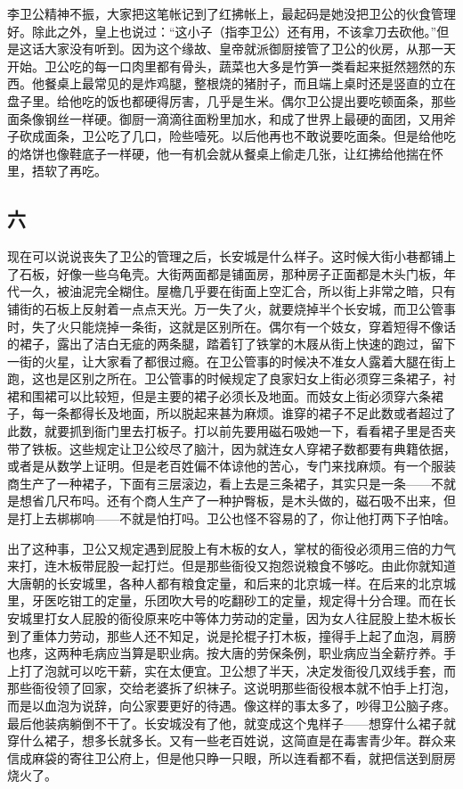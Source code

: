 李卫公精神不振，大家把这笔帐记到了红拂帐上，最起码是她没把卫公的伙食管理好。除此之外，皇上也说过：“这小子（指李卫公）还有用，不该拿刀去砍他。”但是这话大家没有听到。因为这个缘故、皇帝就派御厨接管了卫公的伙房，从那一天开始。卫公吃的每一口肉里都有骨头，蔬菜也大多是竹笋一类看起来挺然翘然的东西。他餐桌上最常见的是炸鸡腿，整根烧的猪肘子，而且端上桌时还是竖直的立在盘子里。给他吃的饭也都硬得厉害，几乎是生米。偶尔卫公提出要吃顿面条，那些面条像钢丝一样硬。御厨一滴滴往面粉里加水，和成了世界上最硬的面团，又用斧子砍成面条，卫公吃了几口，险些噎死。以后他再也不敢说要吃面条。但是给他吃的烙饼也像鞋底子一样硬，他一有机会就从餐桌上偷走几张，让红拂给他揣在怀里，捂软了再吃。 

\subsection{六} 

现在可以说说丧失了卫公的管理之后，长安城是什么样子。这时候大街小巷都铺上了石板，好像一些乌龟壳。大街两面都是铺面房，那种房子正面都是木头门板，年代一久，被油泥完全糊住。屋檐几乎要在街面上空汇合，所以街上非常之暗，只有铺街的石板上反射着一点点天光。万一失了火，就要烧掉半个长安城，而卫公管事时，失了火只能烧掉一条街，这就是区别所在。偶尔有一个妓女，穿着短得不像话的裙子，露出了洁白无疵的两条腿，踏着钉了铁掌的木屐从街上快速的跑过，留下一街的火星，让大家看了都很过瘾。在卫公管事的时候决不准女人露着大腿在街上跑，这也是区别之所在。卫公管事的时候规定了良家妇女上街必须穿三条裙子，衬裙和围裙可以比较短，但是主要的裙子必须长及地面。而妓女上街必须穿六条裙子，每一条都得长及地面，所以脱起来甚为麻烦。谁穿的裙子不足此数或者超过了此数，就要抓到衙门里去打板子。打以前先要用磁石吸她一下，看看裙子里是否夹带了铁板。这些规定让卫公绞尽了脑汁，因为就连女人穿裙子数都要有典籍依据，或者是从数学上证明。但是老百姓偏不体谅他的苦心，专门来找麻烦。有一个服装商生产了一种裙子，下面有三层滚边，看上去是三条裙子，其实只是一条——不就是想省几尺布吗。还有个商人生产了一种护臀板，是木头做的，磁石吸不出来，但是打上去梆梆响——不就是怕打吗。卫公也怪不容易的了，你让他打两下子怕啥。 

出了这种事，卫公又规定遇到屁股上有木板的女人，掌杖的衙役必须用三倍的力气来打，连木板带屁股一起打烂。但是那些衙役又抱怨说粮食不够吃。由此你就知道大唐朝的长安城里，各种人都有粮食定量，和后来的北京城一样。在后来的北京城里，牙医吃钳工的定量，乐团吹大号的吃翻砂工的定量，规定得十分合理。而在长安城里打女人屁股的衙役原来吃中等体力劳动的定量，因为女人往屁股上垫木板长到了重体力劳动，那些人还不知足，说是抡棍子打木板，撞得手上起了血泡，肩膀也疼，这两种毛病应当算是职业病。按大唐的劳保条例，职业病应当全薪疗养。手上打了泡就可以吃干薪，实在太便宜。卫公想了半天，决定发衙役几双线手套，而那些衙役领了回家，交给老婆拆了织袜子。这说明那些衙役根本就不怕手上打泡，而是以血泡为说辞，向公家要更好的待遇。像这样的事太多了，吵得卫公脑子疼。最后他装病躺倒不干了。长安城没有了他，就变成这个鬼样子——想穿什么裙子就穿什么裙子，想多长就多长。又有一些老百姓说，这简直是在毒害青少年。群众来信成麻袋的寄往卫公府上，但是他只睁一只眼，所以连看都不看，就把信送到厨房烧火了。 


